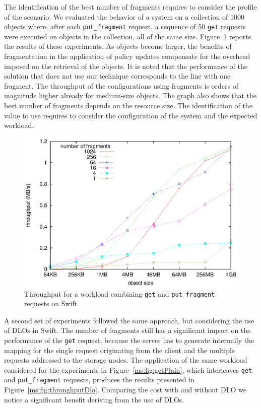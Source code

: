 The identification of the best number of fragments requires to consider the profile of the scenario. We evaluated the behavior of a system on a collection of 1000 objects where, after each {\tt put\_fragment} request, a sequence of 50 {\tt get} requests were executed on objects in the collection, all of the same size. Figure~\ref{ms:fig:throughputMget} reports the results of these experiments. As objects become larger, the benefits of fragmentation in the application of policy updates compensate for the overhead imposed on the retrieval of the objects. It is noted that the performance of the solution that does not use our technique corresponds to the line with one fragment. The throughput of the configurations using fragments is orders of magnitude higher already for medium-size objects. The graph also shows that the best number of fragments depends on the resource size. The identification of the value to use requires to consider the configuration of the system and the expected workload.

\begin{figure}[t]
\centering
\includegraphics[width=0.8\columnwidth,valign=t]{figures/fig11}
\caption{\label{ms:fig:throughputMget}Throughput for a workload combining {\tt get} and {\tt put\_fragment} requests on Swift}
\end{figure}

A second set of experiments followed the same approach, but considering the use of DLOs in Swift. The number of fragments still has a significant impact on the performance of the {\tt get} request, because the server has to generate internally the mapping for the single request originating from the client and the multiple requests addressed to the storage nodes. The application of the same workload considered for the experiments in Figure~\ref{ms:fig:getPlain}, which interleaves {\tt get} and {\tt put\_fragment} requests, produces the results presented in Figure~\ref{ms:fig:throughputDlo}. Comparing the cost with and without DLO we notice a significant benefit deriving from the use of DLOs.


